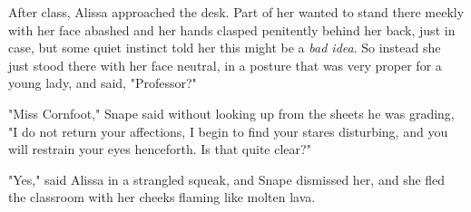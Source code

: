 After class, Alissa approached the desk. Part of her wanted to stand there
meekly with her face abashed and her hands clasped penitently behind her back,
just in case, but some quiet instinct told her this might be a \emph{bad idea}.
So instead she just stood there with her face neutral, in a posture that was
very proper for a young lady, and said, "Professor?"

"Miss Cornfoot," Snape said without looking up from the sheets he was grading,
"I do not return your affections, I begin to find your stares disturbing, and
you will restrain your eyes henceforth. Is that quite clear?"

"Yes," said Alissa in a strangled squeak, and Snape dismissed her, and she fled
the classroom with her cheeks flaming like molten lava.
